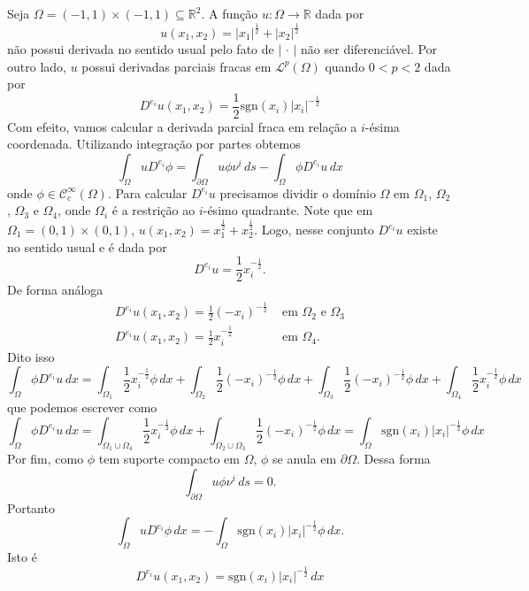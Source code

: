\documentclass[a4paper, 11pt]{book}
\theoremstyle{definition}
\newcommand{\bR}{\mathbb{R}}
\newcommand{\cC}{\mathcal{C}}
\newcommand{\cL}{\mathcal{L}}
\newcommand{\sgn}{\mathrm{sgn}}
\begin{document}
\begin{ex}
    Seja $\Omega = (-1,1) \times (-1,1) \subseteq \bR^2$. A função $u : \Omega \to \bR$ dada por
    \[
        u(x_1,x_2) = |x_1|^{\frac{1}{2}} + |x_2|^{\frac{1}{2}}
    \]
    não possui derivada no sentido usual pelo fato de $|\,\cdot\,|$ não ser diferenciável.
    Por outro lado, $u$ possui derivadas parciais fracas em $\cL^p(\Omega)$ quando $0 < p < 2$ dada por
    \[
        D^{e_i}u(x_1,x_2) = \frac{1}{2}\sgn(x_i) |x_i|^{-\frac{1}{2}}
    \]
    Com efeito, vamos calcular a derivada parcial fraca em relação a $i$-ésima coordenada. Utilizando integração por partes obtemos
    \[
        \int_\Omega u D^{e_i} \phi = \int_{\partial\Omega} u \phi \nu^i \,ds - \int_\Omega \phi D^{e_i}u \,dx
    \]
    onde $\phi \in \cC^\infty_c(\Omega)$.
    Para calcular $D^{e_i} u$ precisamos dividir o domínio $\Omega$ em $\Omega_1$, $\Omega_2$, $\Omega_3$ e $\Omega_4$, onde $\Omega_i$ é a restrição ao $i$-ésimo quadrante.
    Note que em $\Omega_1 = (0,1) \times (0,1)$, $u(x_1,x_2) = x_1^{\frac{1}{2}} + x_2^{\frac{1}{2}}$. Logo, nesse conjunto $D^{e_i} u$ existe no sentido usual e é dada por
    \[
        D^{e_i} u = \frac{1}{2} x_i^{-\frac{1}{2}}.
    \]
    De forma análoga
    \[
        \begin{array}{ll}
            D^{e_i} u(x_1,x_2) = \frac{1}{2} (-x_i)^{-\frac{1}{2}} &\text{ em } \Omega_2 \text{ e } \Omega_3 \\
            D^{e_i} u(x_1,x_2) = \frac{1}{2} x_i^{-\frac{1}{2}} &\text{ em } \Omega_4.
        \end{array}
    \]
    Dito isso
    \[
        \int_\Omega \phi D^{e_i}u \,dx = \int_{\Omega_1}  \frac{1}{2} x_i^{-\frac{1}{2}}\phi \,dx + \int_{\Omega_2} \frac{1}{2} (-x_i)^{-\frac{1}{2}} \phi \,dx + \int_{\Omega_3} \frac{1}{2} (-x_i)^{-\frac{1}{2}} \phi \,dx + \int_{\Omega_4} \frac{1}{2} x_i^{-\frac{1}{2}} \phi \,dx
    \]
    que podemos escrever como
    \[
        \int_\Omega \phi D^{e_i} u \,dx = \int_{\Omega_1 \cup \Omega_4}  \frac{1}{2} x_i^{-\frac{1}{2}}\phi \,dx + \int_{\Omega_2 \cup \Omega_3} \frac{1}{2} (-x_i)^{-\frac{1}{2}} \phi \,dx = \int_\Omega \sgn(x_i) |x_i|^{-\frac{1}{2}} \phi \,dx
    \]
    Por fim, como $\phi$ tem suporte compacto em $\Omega$, $\phi$ se anula em $\partial\Omega$.
    Dessa forma
    \[
        \int_{\partial\Omega} u \phi \nu^i \,ds = 0.
    \]
    Portanto
    \[
        \int_\Omega  u D^{e_i} \phi \,dx = - \int_\Omega \sgn(x_i) |x_i|^{-\frac{1}{2}} \phi \,dx.
    \]
    Isto é
    \[
        D^{e_i} u(x_1,x_2) = \sgn(x_i) |x_i|^{-\frac{1}{2}} \,dx
\]
\end{ex}
\end{document}
